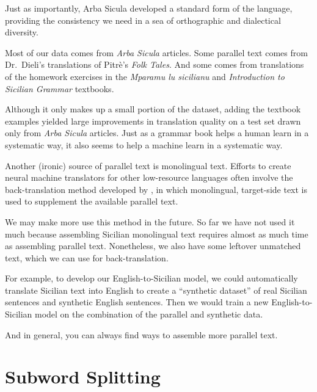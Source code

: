 \documentclass[10pt,letterpaper]{article}
\begin{document}
Just as importantly, Arba Sicula developed a standard form of the language,
providing the consistency we need in a sea of orthographic and dialectical diversity.

Most of our data comes from \textit{Arba Sicula} articles.
Some parallel text comes from Dr.~Dieli's translations of Pitrè's \textit{Folk Tales}.
And some comes from translations of the homework exercises in
the \textit{Mparamu lu sicilianu} \citep{cipolla2013} and 
\textit{Introduction to Sicilian Grammar} \citep{bonner2001} textbooks.

Although it only makes up a small portion of the dataset, adding the textbook examples
yielded large improvements in translation quality on a test set drawn only from
\textit{Arba Sicula} articles.  Just as a grammar book helps a human learn
in a systematic way, it also seems to help a machine learn in a systematic way.

Another (ironic) source of parallel text is monolingual text.
Efforts to create neural machine translators for other low-resource languages often
involve the back-translation method developed by \citet{sennrich2015backtrans},
in which monolingual, target-side text is used to supplement the available parallel text.

We may make more use this method in the future. So far we have not used it much because
assembling Sicilian monolingual text requires almost as much time as assembling parallel text.
Nonetheless, we also have some leftover unmatched text, which we can use for back-translation.

For example, to develop our English-to-Sicilian model, we could automatically translate
Sicilian text into English to create a ``synthetic dataset'' of real Sicilian sentences
and synthetic English sentences.  Then we would train a new English-to-Sicilian model on the
combination of the parallel and synthetic data.

And in general, you can always find ways to assemble more parallel text.



\hypertarget{subword}{}

\section{Subword Splitting}
\end{document}
